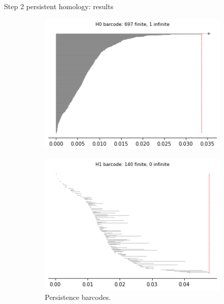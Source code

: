 \documentclass[xcolor={dvipsnames,svgnames}]{beamer}
\begin{document}
\begin{frame}{Step 2 persistent homology: results}
\begin{figure}[H]
\begin{subfigure}[b]{0.25\textwidth}
\end{subfigure}
\begin{subfigure}[b]{0.2\textwidth}
    \includegraphics[width=\textwidth]{figures/X4_H0_barcode.png}
    \caption{}
\end{subfigure}
\begin{subfigure}[b]{0.2\textwidth}
    \includegraphics[width=\textwidth]{figures/X4_H1_barcode.png}
        \caption{Persistence barcodes.}
\end{subfigure}
\begin{subfigure}[b]{0.2\textwidth}

\end{subfigure}
\end{figure}
\end{frame}
\end{document}

